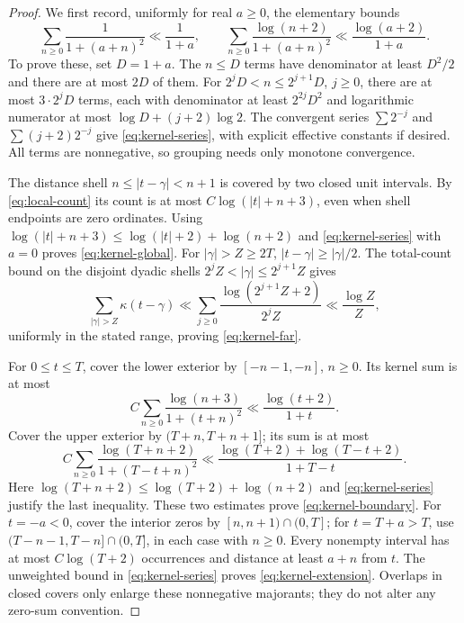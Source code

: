 \documentclass[11pt]{article}
\begin{document}
\begin{proof}
We first record, uniformly for real \(a\geq0\), the elementary bounds
\begin{equation}\label{eq:kernel-series}
 \sum_{n\geq0}\frac1{1+(a+n)^2}\ll\frac1{1+a},\qquad
 \sum_{n\geq0}\frac{\log(n+2)}{1+(a+n)^2}
       \ll\frac{\log(a+2)}{1+a}.
\end{equation}
To prove these, set \(D=1+a\). The \(n\leq D\) terms have
denominator at least \(D^2/2\) and there are at most \(2D\) of them.
For \(2^jD<n\leq2^{j+1}D\), \(j\geq0\), there are at most
\(3\cdot2^jD\) terms, each with denominator at least \(2^{2j}D^2\)
and logarithmic numerator at most \(\log D+(j+2)\log2\).
The convergent series \(\sum2^{-j}\) and \(\sum(j+2)2^{-j}\)
give \eqref{eq:kernel-series}, with explicit effective constants
if desired. All terms are nonnegative, so grouping needs only
monotone convergence.

The distance shell \(n\leq|t-\gamma|<n+1\) is covered by two closed
unit intervals. By \eqref{eq:local-count} its count is at most
\(C\log(|t|+n+3)\), even when shell endpoints are zero ordinates.
Using
\(\log(|t|+n+3)\leq\log(|t|+2)+\log(n+2)\) and
\eqref{eq:kernel-series} with \(a=0\) proves
\eqref{eq:kernel-global}. For \(|\gamma|>Z\geq2T\),
\(|t-\gamma|\geq|\gamma|/2\). The total-count bound on the
disjoint dyadic shells \(2^jZ<|\gamma|\leq2^{j+1}Z\) gives
\[
 \sum_{|\gamma|>Z}\kappa(t-\gamma)
 \ll\sum_{j\geq0}\frac{\log(2^{j+1}Z+2)}{2^jZ}
 \ll\frac{\log Z}{Z},
\]
uniformly in the stated range, proving \eqref{eq:kernel-far}.

For \(0\leq t\leq T\), cover the lower exterior by
\([-n-1,-n]\), \(n\geq0\). Its kernel sum is at most
\[
 C\sum_{n\geq0}\frac{\log(n+3)}{1+(t+n)^2}
 \ll\frac{\log(t+2)}{1+t}.
\]
Cover the upper exterior by \((T+n,T+n+1]\); its sum is at most
\[
 C\sum_{n\geq0}\frac{\log(T+n+2)}{1+(T-t+n)^2}
 \ll\frac{\log(T+2)+\log(T-t+2)}{1+T-t}.
\]
Here \(\log(T+n+2)\leq\log(T+2)+\log(n+2)\) and
\eqref{eq:kernel-series} justify the last inequality.
These two estimates prove \eqref{eq:kernel-boundary}.
For \(t=-a<0\), cover the interior zeros by
\([n,n+1)\cap(0,T]\); for \(t=T+a>T\), use
\((T-n-1,T-n]\cap(0,T]\), in each case with \(n\geq0\).
Every nonempty interval has at most \(C\log(T+2)\) occurrences
and distance at least \(a+n\) from \(t\).
The unweighted bound in \eqref{eq:kernel-series} proves
\eqref{eq:kernel-extension}. Overlaps in closed covers only enlarge
these nonnegative majorants; they do not alter any zero-sum convention.
\end{proof}
\end{document}
